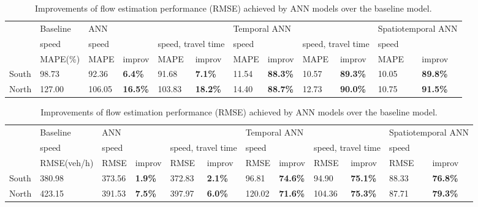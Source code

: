 \documentclass[english]{kththesis}
\begin{document}
\begin{table}
\centering
\begin{tabular}{@{}llllllllllll@{}}
\toprule
& Baseline & \multicolumn{4}{l}{ANN} & \multicolumn{4}{l}{Temporal ANN} & \multicolumn{2}{l}{Spatiotemporal ANN} \\
\cmidrule(lr){3-6} \cmidrule(lr){7-10} \cmidrule(lr){11-12}
& speed & \multicolumn{2}{l}{speed} & \multicolumn{2}{l}{speed, travel time} & \multicolumn{2}{l}{speed} & \multicolumn{2}{l}{speed, travel time} & \multicolumn{2}{l}{speed} \\
\cmidrule(lr){3-4} \cmidrule(lr){5-6} \cmidrule(lr){7-8} \cmidrule(lr){9-10} \cmidrule(lr){11-12}
& MAPE(\%) & MAPE & improv & MAPE & improv & MAPE & improv & MAPE & improv & MAPE & improv \\
\midrule
South & 98.73 & 92.36  & \textbf{6.4\%} & 91.68 & \textbf{7.1\%} & 11.54 & \textbf{88.3\%} & 10.57 & \textbf{89.3\%} & 10.05 & \textbf{89.8\%} \\
North & 127.00 & 106.05 & \textbf{16.5\%} & 103.83 & \textbf{18.2\%} & 14.40 & \textbf{88.7\%} & 12.73 & \textbf{90.0\%} & 10.75 & \textbf{91.5\%} \\
\bottomrule
\end{tabular}
\caption{Improvements of flow estimation performance (MAPE) achieved by ANN models over the baseline model.}
\label{tab:mape_imrpov}

\bigskip
\bigskip

\begin{tabular}{@{}llllllllllll@{}}
\toprule
& Baseline & \multicolumn{4}{l}{ANN} & \multicolumn{4}{l}{Temporal ANN} & \multicolumn{2}{l}{Spatiotemporal ANN} \\
\cmidrule(lr){3-6} \cmidrule(lr){7-10} \cmidrule(lr){11-12}
& speed & \multicolumn{2}{l}{speed} & \multicolumn{2}{l}{speed, travel time} & \multicolumn{2}{l}{speed} & \multicolumn{2}{l}{speed, travel time} & \multicolumn{2}{l}{speed} \\
\cmidrule(lr){3-4} \cmidrule(lr){5-6} \cmidrule(lr){7-8} \cmidrule(lr){9-10} \cmidrule(lr){11-12}
& RMSE(veh/h) & RMSE & improv & RMSE & improv & RMSE & improv & RMSE & improv & RMSE & improv \\
\midrule
South & 380.98 & 373.56  & \textbf{1.9\%} & 372.83 & \textbf{2.1\%} & 96.81 & \textbf{74.6\%} & 94.90 & \textbf{75.1\%} & 88.33 & \textbf{76.8\%} \\
North & 423.15 & 391.53 & \textbf{7.5\%} & 397.97 & \textbf{6.0\%} & 120.02 & \textbf{71.6\%} & 104.36 & \textbf{75.3\%} & 87.71 & \textbf{79.3\%} \\
\bottomrule
\end{tabular}
\caption{Improvements of flow estimation performance (RMSE) achieved by ANN models over the baseline model.}
\label{tab:rmse_imrpov}
\end{table}
\end{document}
